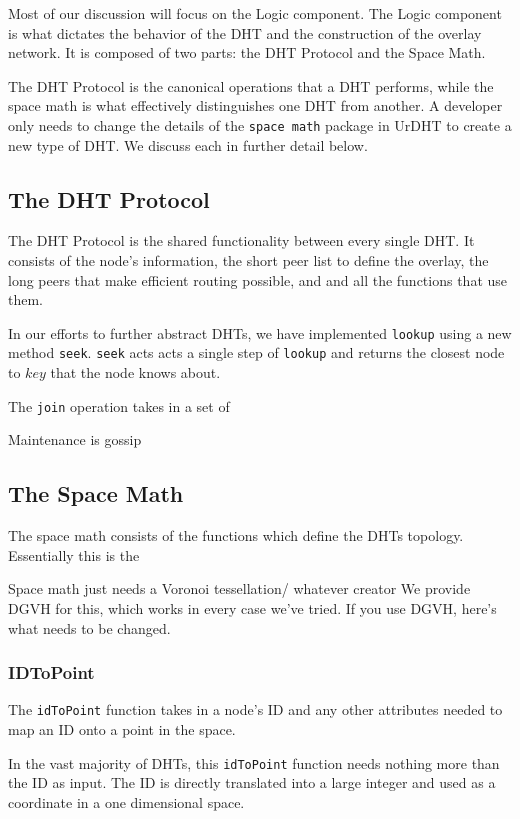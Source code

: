 \documentclass[11pt,conference]{IEEEtran}
\begin{document}
Most of our discussion will focus on the Logic component.
The Logic component is what dictates the behavior of the DHT and the construction of the overlay network.
It is composed of two parts: the DHT Protocol and the Space Math.

The DHT Protocol is the canonical operations that a DHT performs, while the space math is what effectively distinguishes one DHT from another.
A developer only needs to change the details of the \texttt{space math} package in UrDHT to create a new type of DHT.
We discuss each in further detail below.

\subsection{The DHT Protocol }
\label{sec:protocol}
The DHT Protocol is the shared functionality between every single DHT.
It consists of the node's information, the short peer list to define the overlay, the long peers that make efficient routing possible, and and all the functions that use them.

In our efforts to further abstract DHTs, we have implemented \texttt{lookup} using a new method \texttt{seek}.
\texttt{seek} acts acts a single step of \texttt{lookup} and returns the closest node to $ key $ that the node knows about.

The \texttt{join} operation takes in a set of


Maintenance is gossip
\subsection{The Space Math}
The space math consists of the functions which define the DHTs topology.
Essentially this is the

Space math just needs a Voronoi tessellation/ whatever creator
We provide DGVH for this, which works in every case we've tried.
If you use DGVH, here's what needs to be changed.

\subsubsection{IDToPoint}
The \texttt{idToPoint} function takes in a node's ID and any other attributes needed to map an ID onto a point in the space.

In the vast majority of DHTs, this \texttt{idToPoint} function needs nothing more than the ID as input.
The ID is directly translated into a large integer and used as a coordinate in a one dimensional space.
\end{document}
